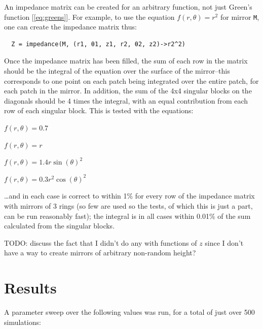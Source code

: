 \documentclass[etd,twoside,senior]{BYUPhys}
\begin{document}
An impedance matrix can be created for an arbitrary function, not just Green's function [\ref{eq:greens}]. For example, to use the equation $f\left(r, \theta\right) = r^2$ for mirror \texttt{M}, one can create the impedance matrix thus:

\begin{verbatim}
  Z = impedance(M, (r1, θ1, z1, r2, θ2, z2)->r2^2)
\end{verbatim}

Once the impedance matrix has been filled, the sum of each row in the matrix should be the integral of the equation over the surface of the mirror--this corresponds to one point on each patch being integrated over the entire patch, for each patch in the mirror. In addition, the sum of the 4x4 singular blocks on the diagonals should be 4 times the integral, with an equal contribution from each row of each singular block. This is tested with the equations:

$f\left(r, \theta\right) = 0.7$

$f\left(r, \theta\right) = r$

$f\left(r, \theta\right) = 1.4 r \sin\left(\theta\right)^2$

$f\left(r, \theta\right) = 0.3 r^2 \cos\left(\theta\right)^2$

\ldots and in each case is correct to within 1\% for every row of the impedance matrix with mirrors of 3 rings (so few are used so the tests, of which this is just a part, can be run reasonably fast); the integral is in all cases within 0.01\% of the sum calculated from the singular blocks.

TODO: discuss the fact that I didn't do any with functions of $z$ since I don't have a way to create mirrors of arbitrary non-random height?







\chapter{Results}\label{chap:results}

A parameter sweep over the following values was run, for a total of just over 500 simulations:
\end{document}
